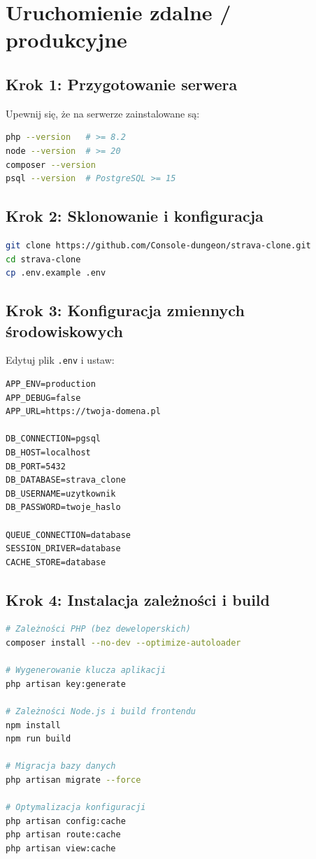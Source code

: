 \documentclass[12pt,a4paper]{report}
\begin{document}
\section{Uruchomienie zdalne / produkcyjne}

\subsection{Krok 1: Przygotowanie serwera}

Upewnij się, że na serwerze zainstalowane są:
\begin{lstlisting}[language=bash, numbers=none]
php --version   # >= 8.2
node --version  # >= 20
composer --version
psql --version  # PostgreSQL >= 15
\end{lstlisting}

\subsection{Krok 2: Sklonowanie i konfiguracja}

\begin{lstlisting}[language=bash, numbers=none]
git clone https://github.com/Console-dungeon/strava-clone.git
cd strava-clone
cp .env.example .env
\end{lstlisting}

\subsection{Krok 3: Konfiguracja zmiennych środowiskowych}

Edytuj plik \texttt{.env} i ustaw:

\begin{lstlisting}[numbers=none]
APP_ENV=production
APP_DEBUG=false
APP_URL=https://twoja-domena.pl

DB_CONNECTION=pgsql
DB_HOST=localhost
DB_PORT=5432
DB_DATABASE=strava_clone
DB_USERNAME=uzytkownik
DB_PASSWORD=twoje_haslo

QUEUE_CONNECTION=database
SESSION_DRIVER=database
CACHE_STORE=database
\end{lstlisting}

\subsection{Krok 4: Instalacja zależności i build}

\begin{lstlisting}[language=bash, numbers=none]
# Zależności PHP (bez deweloperskich)
composer install --no-dev --optimize-autoloader

# Wygenerowanie klucza aplikacji
php artisan key:generate

# Zależności Node.js i build frontendu
npm install
npm run build

# Migracja bazy danych
php artisan migrate --force

# Optymalizacja konfiguracji
php artisan config:cache
php artisan route:cache
php artisan view:cache
\end{lstlisting}
\end{document}
